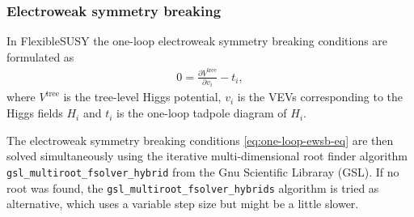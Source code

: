 \documentclass[final,3p,11pt,pdflatex]{elsarticle}
\newcommand{\fs}{FlexibleSUSY\xspace}
\newcommand{\code}[1]{\lstinline|#1|}  %
\begin{document}
\subsubsection{Electroweak symmetry breaking}
\label{sec:ewsb}

In \fs the one-loop electroweak symmetry breaking conditions are
formulated as
%
\begin{align}
  0 = \frac{\partial V^\text{tree}}{\partial v_i} - t_i,
  \label{eq:one-loop-ewsb-eq}
\end{align}
%
where $V^\text{tree}$ is the tree-level Higgs potential, $v_i$ is the
VEVs corresponding to the Higgs fields $H_i$ and $t_i$ is the one-loop
tadpole diagram of $H_i$.

The electroweak symmetry breaking conditions
\eqref{eq:one-loop-ewsb-eq} are then solved simultaneously using the
iterative multi-dimensional root finder algorithm
\code{gsl_multiroot_fsolver_hybrid} from the Gnu Scientific Libraray
(GSL).  If no root was found, the \code{gsl_multiroot_fsolver_hybrids}
algorithm is tried as alternative, which uses a variable step size but
might be a little slower.
\end{document}
